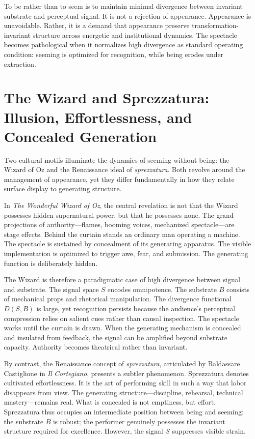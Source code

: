 \documentclass[11pt]{article}
\begin{document}
To be rather than to seem is to maintain minimal divergence between invariant substrate and perceptual signal. It is not a rejection of appearance. Appearance is unavoidable. Rather, it is a demand that appearance preserve transformation-invariant structure across energetic and institutional dynamics. The spectacle becomes pathological when it normalizes high divergence as standard operating condition: seeming is optimized for recognition, while being erodes under extraction.

\section{The Wizard and Sprezzatura: Illusion, Effortlessness, and Concealed Generation}

Two cultural motifs illuminate the dynamics of seeming without being: the Wizard of Oz and the Renaissance ideal of \textit{sprezzatura}. Both revolve around the management of appearance, yet they differ fundamentally in how they relate surface display to generating structure.

In \textit{The Wonderful Wizard of Oz}, the central revelation is not that the Wizard possesses hidden supernatural power, but that he possesses none. The grand projections of authority---flames, booming voices, mechanized spectacle---are stage effects. Behind the curtain stands an ordinary man operating a machine. The spectacle is sustained by concealment of its generating apparatus. The visible implementation is optimized to trigger awe, fear, and submission. The generating function is deliberately hidden.

The Wizard is therefore a paradigmatic case of high divergence between signal and substrate. The signal space $S$ encodes omnipotence. The substrate $B$ consists of mechanical props and rhetorical manipulation. The divergence functional $D(S,B)$ is large, yet recognition persists because the audience's perceptual compression relies on salient cues rather than causal inspection. The spectacle works until the curtain is drawn. When the generating mechanism is concealed and insulated from feedback, the signal can be amplified beyond substrate capacity. Authority becomes theatrical rather than invariant.

By contrast, the Renaissance concept of \textit{sprezzatura}, articulated by Baldassare Castiglione in \textit{Il Cortegiano}, presents a subtler phenomenon. Sprezzatura denotes cultivated effortlessness. It is the art of performing skill in such a way that labor disappears from view. The generating structure---discipline, rehearsal, technical mastery---remains real. What is concealed is not emptiness, but effort. Sprezzatura thus occupies an intermediate position between being and seeming: the substrate $B$ is robust; the performer genuinely possesses the invariant structure required for excellence. However, the signal $S$ suppresses visible strain.
\end{document}
